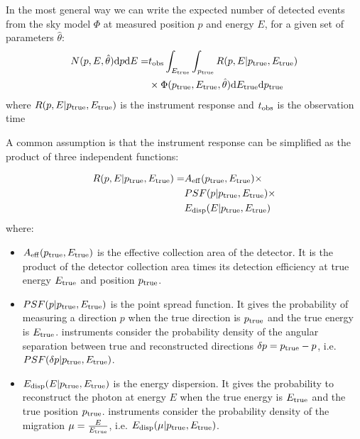 \documentclass[traditabstract, longauth]{aa}
\begin{document}
In the most general way we can write the expected number of detected events from the sky model $\Phi$ at measured position
$p$ and energy $E$, for a given set of parameters $\hat{\theta}$:
\begin{align}
   N(p, E, \hat{\theta}) {\rm d}p {\rm d}E = &t_{\rm obs} \int_{E_{\rm true}} \int_{p_{\rm true}}  R(p, E|p_{\rm true}, E_{\rm true}) \nonumber \\
   &\times \Phi(p_{\rm true}, E_{\rm true}, \hat{\theta} ) {\rm d}E_{\rm true} {\rm d}p_{\rm true}
\end{align}
where $R(p, E| p_{\rm true}, E_{\rm true})$ is the instrument response and $t_{\rm obs}$ is the observation time

A common assumption is that the instrument response can be simplified as the product
of three independent functions:

\begin{align}
   R(p, E|p_{\rm true}, E_{\rm true}) = &A_{\rm eff}(p_{\rm true}, E_{\rm true}) \times \nonumber \\
    &PSF(p|p_{\rm true}, E_{\rm true}) \times \nonumber \\
    &E_{\rm disp}(E|p_{\rm true}, E_{\rm true})
\end{align}
where:
\begin{itemize}
\item $A_{\rm eff}(p_{\rm true}, E_{\rm true})$ is the effective collection area of the detector. It is the product
  of the detector collection area times its detection efficiency at true energy $E_{\rm true}$ and position $p_{\rm true}$.
\item $PSF(p|p_{\rm true}, E_{\rm true})$ is the point spread function. It gives the probability of
  measuring a direction $p$ when the true direction is $p_{\rm true}$ and the true energy is $E_{\rm true}$.
  \gammaray instruments consider the probability density of the angular separation between true and reconstructed directions
  $\delta p = p_{\rm true} - p$, i.e. $PSF(\delta p|p_{\rm true}, E_{\rm true})$.
\item $E_{\rm disp}(E|p_{\rm true}, E_{\rm true})$ is the energy dispersion. It gives the probability to
  reconstruct the photon at energy $E$ when the true energy is $E_{\rm true}$ and the true position $p_{\rm true}$.
  \gammaray instruments consider the probability density of the migration $\mu=\frac{E}{E_{\rm true}}$,
  i.e. $E_{\rm disp}(\mu|p_{\rm true}, E_{\rm true})$.
\end{itemize}
\end{document}
